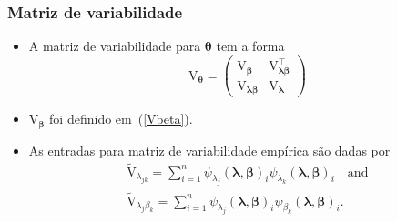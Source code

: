 \documentclass[10pt, aspectratio=169]{beamer}\usepackage[]{graphicx}\usepackage[]{color}
\begin{document}
\begin{frame}[c]
\frametitle{Matriz de variabilidade}
\begin{itemize}
\item A matriz de variabilidade para $\boldsymbol{\theta}$ tem a forma
\begin{equation*}
\label{VTHETA}
\mathrm{V}_{\boldsymbol{\theta}} = \begin{pmatrix}
\mathrm{V}_{\boldsymbol{\beta}} & \mathrm{V}^{\top}_{\boldsymbol{\lambda}\boldsymbol{\beta}} \\ 
\mathrm{V}_{\boldsymbol{\lambda}\boldsymbol{\beta}} & \mathrm{V}_{\boldsymbol{\lambda}}
\end{pmatrix}
\end{equation*}
\item $\mathrm{V}_{\boldsymbol{\beta}}$ foi definido em~(\ref{Vbeta}).
\item As entradas para matriz de variabilidade empírica são dadas por
\begin{eqnarray*}
\tilde{\mathrm{V}}_{\lambda_{jk}} = \sum_{i=1}^n \psi_{\lambda_j}(\boldsymbol{\lambda}, \boldsymbol{\beta})_i \psi_{\lambda_k}(\boldsymbol{\lambda}, \boldsymbol{\beta})_i \quad \text{and} \\  \tilde{\mathrm{V}}_{\lambda_j \beta_k} = \sum_{i=1}^n \psi_{\lambda_j}(\boldsymbol{\lambda}, \boldsymbol{\beta})_i \psi_{\beta_k}(\boldsymbol{\lambda}, \boldsymbol{\beta})_i.
\end{eqnarray*}
\end{itemize}
\end{frame}
\end{document}
